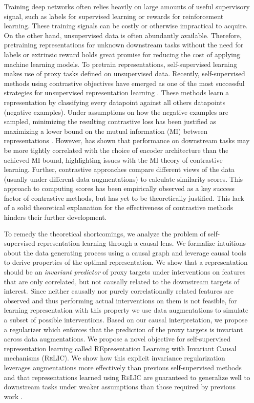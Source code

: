 \documentclass{article}
\newcommand{\relic}{\textsc{ReLIC}}
\begin{document}
Training deep networks often relies heavily on large amounts of useful supervisory signal, such as labels for supervised learning or rewards for reinforcement learning. 
These training signals can be costly or otherwise impractical to acquire. 
On the other hand, unsupervised data is often abundantly available. 
Therefore, pretraining representations for unknown downstream tasks without the need for labels or extrinsic reward holds great promise for reducing the cost of applying machine learning models.
To pretrain representations, self-supervised learning makes use of proxy tasks defined on unsupervised data.
Recently, self-supervised methods using contrastive objectives have emerged as one of the most successful strategies for unsupervised representation learning \citep{oord2018representation, hjelm2018learning, chen2020simple}.
These methods learn a representation by classifying every datapoint against all others datapoints (negative examples). 
Under assumptions on how the negative examples are sampled, minimizing the resulting contrastive loss has been justified as maximizing a lower bound on the mutual information (MI) between representations \citep{poole2019variational}. 
However, \citep{tschannen2019mutual} has shown that performance on downstream tasks may be more tightly correlated with the choice of encoder architecture than the achieved MI bound, highlighting issues with the MI theory of contrastive learning. 
Further, contrastive approaches compare different views of the data (usually under different data augmentations) to calculate similarity scores.
This approach to computing scores has been empirically observed as a key success factor of contrastive methods, but has yet to be theoretically justified.
This lack of a solid theoretical explanation for the effectiveness of contrastive methods hinders their further development.

To remedy the theoretical shortcomings, we analyze the problem of self-supervised representation learning through a causal lens.
We formalize intuitions about the data generating process using a causal graph and leverage causal tools to derive properties of the optimal representation.
We show that a representation should be an \emph{invariant predictor} of proxy targets under interventions on features that are only correlated, but not causally related to the downstream targets of interest.
Since neither causally nor purely correlationally related features are observed and thus performing actual interventions on them is not feasible, for learning representation with this property we use data augmentations to simulate a subset of possible interventions.
Based on our causal interpretation, we propose a regularizer which enforces that the prediction of the proxy targets is invariant across data augmentations. 
We propose a novel objective for self-supervised representation learning called REpresentation Learning with Invariant Causal mechanisms (\relic). 
We show how this explicit invariance regularization leverages augmentations more effectively than previous self-supervised methods and that representations learned using \relic{} are guaranteed to generalize well to downstream tasks under weaker assumptions than those required by previous work \citep{saunshi2019theoretical}.
\end{document}
